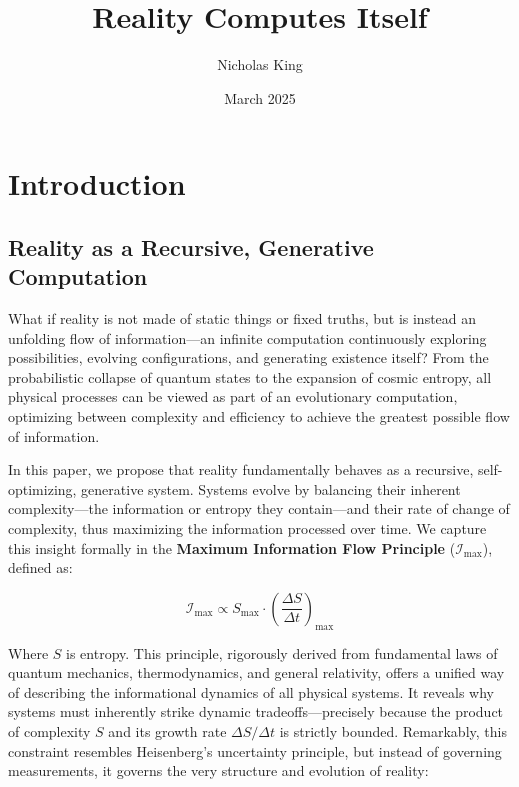 \documentclass[12pt]{article}
\begin{document}
\title{Reality Computes Itself}
\author{Nicholas King}
\date{March 2025}

\maketitle

\section{Introduction}

\subsection{Reality as a Recursive, Generative Computation}

What if reality is not made of static things or fixed truths, but is instead an unfolding flow of information—an infinite computation continuously exploring possibilities, evolving configurations, and generating existence itself? From the probabilistic collapse of quantum states to the expansion of cosmic entropy, all physical processes can be viewed as part of an evolutionary computation, optimizing between complexity and efficiency to achieve the greatest possible flow of information.

In this paper, we propose that reality fundamentally behaves as a recursive, self-optimizing, generative system. Systems evolve by balancing their inherent complexity—the information or entropy they contain—and their rate of change of complexity, thus maximizing the information processed over time. We capture this insight formally in the \textbf{Maximum Information Flow Principle} ($\mathcal{I}_{\text{max}}$), defined as:

\begin{equation}
    \mathcal{I}_{\text{max}} \propto S_{\text{max}} \cdot \left(\frac{\Delta S}{\Delta t}\right)_{\text{max}}
\end{equation}

Where $S$ is entropy. This principle, rigorously derived from fundamental laws of quantum mechanics, thermodynamics, and general relativity, offers a unified way of describing the informational dynamics of all physical systems. It reveals why systems must inherently strike dynamic tradeoffs—precisely because the product of complexity \( S \) and its growth rate \(\Delta S / \Delta t\) is strictly bounded. Remarkably, this constraint resembles Heisenberg's uncertainty principle, but instead of governing measurements, it governs the very structure and evolution of reality:
\end{document}
